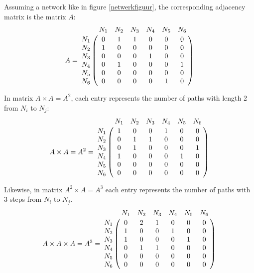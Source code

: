 Assuming a network like in figure \ref{netwerkfiguur}, the corresponding adjacency matrix is the  matrix $A$: \\

\begin{equation}
A =
\bordermatrix{
         & N_1		& N_2	& N_3	& N_4 	& N_5	&N_6     \cr
    N_1   & 0		& 1		& 1		& 0		& 0		& 0	     \cr
    N_2   & 1		& 0		& 0		& 0		& 0		& 0	     \cr
    N_3   & 0		& 0		& 0		& 1		& 0		& 0	     \cr
    N_4   & 0		& 1		& 0		& 0		& 0		& 1	     \cr
	N_5   & 0		& 0		& 0		& 0		& 0		& 0	     \cr
	N_6   & 0		& 0		& 0		& 0		& 1		& 0	     \cr
}
\end{equation}

In matrix $A \times A = A^{2}$, each entry represents the number of  paths with length 2 from $N_{i}$ to $N_{j}$:\\


\begin{equation}
 A \times A = A^{2} =
\bordermatrix{
         & N_1		& N_2	& N_3	& N_4 	& N_5	&N_6     \cr
    N_1   & 1		& 0		& 0		& 1		& 0		& 0	     \cr
    N_2   & 0		& 1		& 1		& 0		& 0		& 0	     \cr
    N_3   & 0		& 1		& 0		& 0		& 0		& 1 	     \cr
    N_4   & 1	    & 0		& 0		& 0		& 1		& 0	     \cr
	N_5   & 0		& 0		& 0		& 0		& 0		& 0	     \cr
	N_6   & 0		& 0		& 0		& 0		& 0		& 0	     \cr
}
\end{equation}

Likewise, in matrix $A^{2} \times A = A^{3}$ each entry represents the number of paths with 3 steps from $N_{i}$ to $N_{j}$.\\


\begin{equation}
 A \times A \times A = A^{3} =
\bordermatrix{
         & N_1		& N_2	& N_3	& N_4 	& N_5	&N_6     \cr
    N_1   & 0		& 2		& 1		& 0		& 0		& 0	     \cr
    N_2   & 1		& 0		& 0		& 1		& 0		& 0	     \cr
    N_3   & 1		& 0		& 0		& 0		& 1		& 0	     \cr
    N_4   & 0		& 1		& 1		& 0		& 0		& 0	     \cr
	N_5   & 0		& 0		& 0		& 0		& 0		& 0	     \cr
	N_6   & 0		& 0		& 0		& 0		& 0		& 0	     \cr
}
\end{equation}


